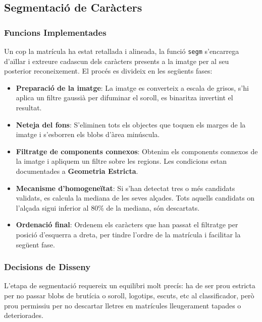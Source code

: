 
\subsection{Segmentació de Caràcters}

\subsubsection{Funcions Implementades}
Un cop la matrícula ha estat retallada i alineada, la funció \texttt{segm} s'encarrega d'aïllar i extreure cadascun dels caràcters presents a la imatge per al seu posterior reconeixement. El procés es divideix en les següents fases:
\begin{itemize}
    \item \textbf{Preparació de la imatge}: La imatge es converteix a escala de grisos, s'hi aplica un filtre gaussià per difuminar el soroll, es binaritza invertint el resultat.
    \item \textbf{Neteja del fons}: S'eliminen tots els objectes que toquen els marges de la imatge i s'esborren els blobs d'àrea minúscula.
    \item \textbf{Filtratge de components connexos}: Obtenim els components connexos de la imatge i apliquem un filtre sobre les regions. Les condicions estan documentades a \textbf{Geometria Estricta}.
    \item \textbf{Mecanisme d'homogeneïtat}: Si s'han detectat tres o més candidats validats, es calcula la mediana de les seves alçades. Tots aquells candidats on l'alçada sigui inferior al 80\% de la mediana, són descartats.
    \item \textbf{Ordenació final}: Ordenem els caràcters que han passat el filtratge per posició d'esquerra a dreta, per tindre l'ordre de la matrícula i facilitar la següent fase.
\end{itemize}
\subsubsection{Decisions de Disseny}

L'etapa de segmentació requereix un equilibri molt precís: ha de ser prou estricta per no passar blobs de brutícia o soroll, logotips, escuts, etc al classificador, però prou permissiu per no descartar lletres en matrícules lleugerament tapades o deteriorades.

